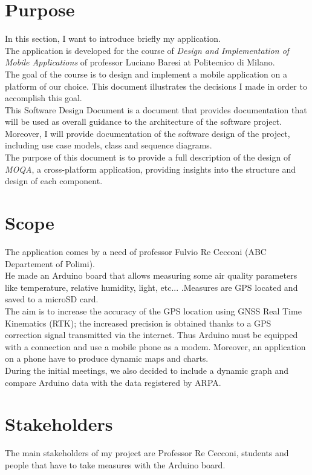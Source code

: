 \section{Purpose}
In this section, I want to introduce briefly my application.\\

The application is developed for the course of \textit{Design and Implementation of Mobile
Applications} of professor Luciano Baresi at Politecnico di Milano.\\
The goal of the course is to design and implement a mobile application on a platform of our choice.
This document illustrates the decisions I made in order to accomplish this goal.\\

This Software Design Document is a document that provides documentation that will be
used as overall guidance to the architecture of the software project. Moreover, I will
provide documentation of the software design of the project, including use case models,
class and sequence diagrams.\\

The purpose of this document is to provide a full description of the design of \textit{MOQA}, a cross-platform application, providing insights into the structure and design of each component.

\section{Scope}
The application comes by a need of professor Fulvio Re Cecconi (ABC Departement of Polimi).\\
He made an Arduino board that allows measuring some
air quality parameters like temperature, relative humidity, light, etc... .Measures are GPS located and saved to a microSD card.\\

The aim is to increase the accuracy of the GPS location using GNSS Real Time Kinematics (RTK); the increased precision is obtained thanks to a GPS correction signal transmitted via the internet. Thus Arduino must be equipped with a connection and use a mobile phone as a modem. Moreover, an application on a phone have to produce dynamic maps and charts.\\

During the initial meetings, we also decided to include a dynamic graph and compare Arduino data with the data registered by ARPA.

\section{Stakeholders}
The main stakeholders of my project are Professor Re Cecconi, students and people that have to take measures with the Arduino board.\\

